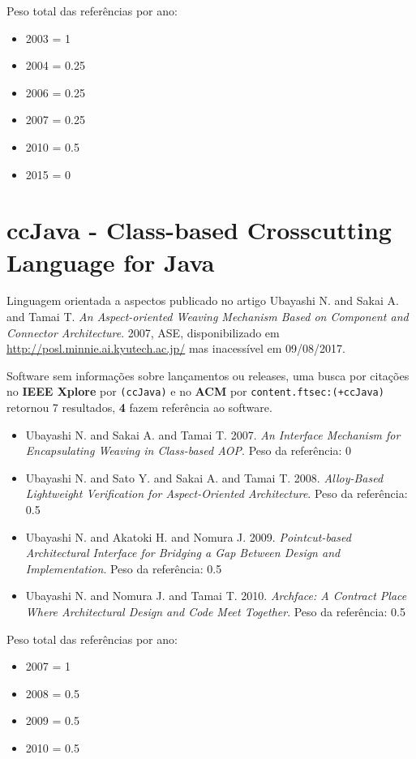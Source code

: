 Peso total das referências por ano:

\begin{itemize}
\item 2003 = 1
\item 2004 = 0.25
\item 2006 = 0.25
\item 2007 = 0.25
\item 2010 = 0.5
\item 2015 = 0
\end{itemize}


\section{ccJava - Class-based Crosscutting Language for Java}

Linguagem orientada a aspectos
publicado no artigo
Ubayashi N. and Sakai A. and Tamai T.
{\it An Aspect-oriented Weaving Mechanism Based on Component and Connector Architecture}.
2007,
ASE,
disponibilizado em \url{http://posl.minnie.ai.kyutech.ac.jp/}
mas inacessível em 09/08/2017.

Software sem informações sobre lançamentos ou releases,
uma busca por citações no {\bf IEEE Xplore} por
\texttt{(ccJava)}
e no {\bf ACM} por
\texttt{content.ftsec:(+ccJava)}
retornou
7 resultados,
{\bf 4} fazem referência ao software.

\begin{itemize}
\item Ubayashi N. and Sakai A. and Tamai T.
      2007.
      {\it An Interface Mechanism for Encapsulating Weaving in Class-based AOP}.
      Peso da referência: 0
\item Ubayashi N. and Sato Y. and Sakai A. and Tamai T.
      2008.
      {\it Alloy-Based Lightweight Verification for Aspect-Oriented Architecture}.
      Peso da referência: 0.5
\item Ubayashi N. and Akatoki H. and Nomura J.
      2009.
      {\it Pointcut-based Architectural Interface for Bridging a Gap Between Design and Implementation}.
      Peso da referência: 0.5
\item Ubayashi N. and Nomura J. and Tamai T.
      2010.
      {\it Archface: A Contract Place Where Architectural Design and Code Meet Together}.
      Peso da referência: 0.5
\end{itemize}

Peso total das referências por ano:

\begin{itemize}
\item 2007 = 1
\item 2008 = 0.5
\item 2009 = 0.5
\item 2010 = 0.5
\end{itemize}


